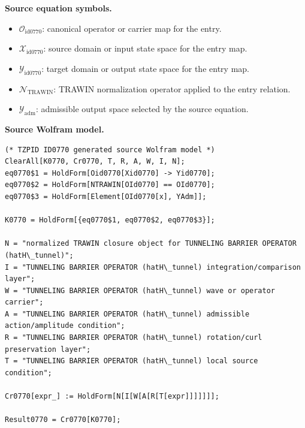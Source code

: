 \begin{minipage}[t]{0.49\linewidth}
\begingroup
\small
\raggedright
\textbf{Source equation symbols.}\par
\begin{itemize}[leftmargin=1.35em,itemsep=1pt,topsep=1pt,parsep=0pt]
    \item $\mathcal{O}_{\mathrm{id0770}}$: canonical operator or carrier map for the entry.
    \item $\mathcal{X}_{\mathrm{id0770}}$: source domain or input state space for the entry map.
    \item $\mathcal{Y}_{\mathrm{id0770}}$: target domain or output state space for the entry map.
    \item $\mathcal{N}_{\mathrm{TRAWIN}}$: TRAWIN normalization operator applied to the entry relation.
    \item $\mathcal{Y}_{\mathrm{adm}}$: admissible output space selected by the source equation.
\end{itemize}
\endgroup
\end{minipage}\hfill
\begin{minipage}[t]{0.47\linewidth}
\begingroup
\scriptsize
\raggedright
\textbf{Source Wolfram model.}\par
\begin{Verbatim}[fontsize=\tiny,breaklines=true,breakanywhere=true]
(* TZPID ID0770 generated source Wolfram model *)
ClearAll[K0770, Cr0770, T, R, A, W, I, N];
eq0770$1 = HoldForm[Oid0770[Xid0770] -> Yid0770];
eq0770$2 = HoldForm[NTRAWIN[OId0770] == OId0770];
eq0770$3 = HoldForm[Element[OId0770[x], YAdm]];

K0770 = HoldForm[{eq0770$1, eq0770$2, eq0770$3}];

N = "normalized TRAWIN closure object for TUNNELING BARRIER OPERATOR (hatH\_tunnel)";
I = "TUNNELING BARRIER OPERATOR (hatH\_tunnel) integration/comparison layer";
W = "TUNNELING BARRIER OPERATOR (hatH\_tunnel) wave or operator carrier";
A = "TUNNELING BARRIER OPERATOR (hatH\_tunnel) admissible action/amplitude condition";
R = "TUNNELING BARRIER OPERATOR (hatH\_tunnel) rotation/curl preservation layer";
T = "TUNNELING BARRIER OPERATOR (hatH\_tunnel) local source condition";

Cr0770[expr_] := HoldForm[N[I[W[A[R[T[expr]]]]]]];

Result0770 = Cr0770[K0770];
\end{Verbatim}
\endgroup
\end{minipage}

